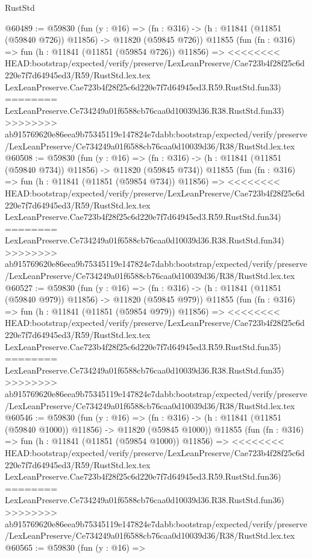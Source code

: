 \begin{lexlean}{RustStd}
\begin{coremodule}
{\begin{coremodule}
{{{{{{{{{{{{{{{{{{{{{{{{{{{{{{{{{{{{{{{{{{{{{{{{{{@60489 := @59830
    (fun (y : @16) =>
    (fn : @316) -> (h : @11841 (@11851 (@59840 @726)) @11856) -> @11820 (@59845 @726))
    @11855
    (fun (fn : @316) =>
    fun (h : @11841 (@11851 (@59854 @726)) @11856) =>
<<<<<<<< HEAD:bootstrap/expected/verify/preserve/LexLeanPreserve/Cae723b4f28f25c6d220e7f7d64945ed3/R59/RustStd.lex.tex
    LexLeanPreserve.Cae723b4f28f25c6d220e7f7d64945ed3.R59.RustStd.fun33)
========
    LexLeanPreserve.Ce734249a01f6588cb76caa0d10039d36.R38.RustStd.fun33)
>>>>>>>> ab915769620e86eea9b75345119e147824e7dabb:bootstrap/expected/verify/preserve/LexLeanPreserve/Ce734249a01f6588cb76caa0d10039d36/R38/RustStd.lex.tex
@60508 := @59830
    (fun (y : @16) =>
    (fn : @316) -> (h : @11841 (@11851 (@59840 @734)) @11856) -> @11820 (@59845 @734))
    @11855
    (fun (fn : @316) =>
    fun (h : @11841 (@11851 (@59854 @734)) @11856) =>
<<<<<<<< HEAD:bootstrap/expected/verify/preserve/LexLeanPreserve/Cae723b4f28f25c6d220e7f7d64945ed3/R59/RustStd.lex.tex
    LexLeanPreserve.Cae723b4f28f25c6d220e7f7d64945ed3.R59.RustStd.fun34)
========
    LexLeanPreserve.Ce734249a01f6588cb76caa0d10039d36.R38.RustStd.fun34)
>>>>>>>> ab915769620e86eea9b75345119e147824e7dabb:bootstrap/expected/verify/preserve/LexLeanPreserve/Ce734249a01f6588cb76caa0d10039d36/R38/RustStd.lex.tex
@60527 := @59830
    (fun (y : @16) =>
    (fn : @316) -> (h : @11841 (@11851 (@59840 @979)) @11856) -> @11820 (@59845 @979))
    @11855
    (fun (fn : @316) =>
    fun (h : @11841 (@11851 (@59854 @979)) @11856) =>
<<<<<<<< HEAD:bootstrap/expected/verify/preserve/LexLeanPreserve/Cae723b4f28f25c6d220e7f7d64945ed3/R59/RustStd.lex.tex
    LexLeanPreserve.Cae723b4f28f25c6d220e7f7d64945ed3.R59.RustStd.fun35)
========
    LexLeanPreserve.Ce734249a01f6588cb76caa0d10039d36.R38.RustStd.fun35)
>>>>>>>> ab915769620e86eea9b75345119e147824e7dabb:bootstrap/expected/verify/preserve/LexLeanPreserve/Ce734249a01f6588cb76caa0d10039d36/R38/RustStd.lex.tex
@60546 := @59830
    (fun (y : @16) =>
    (fn : @316) -> (h : @11841 (@11851 (@59840 @1000)) @11856) -> @11820 (@59845 @1000))
    @11855
    (fun (fn : @316) =>
    fun (h : @11841 (@11851 (@59854 @1000)) @11856) =>
<<<<<<<< HEAD:bootstrap/expected/verify/preserve/LexLeanPreserve/Cae723b4f28f25c6d220e7f7d64945ed3/R59/RustStd.lex.tex
    LexLeanPreserve.Cae723b4f28f25c6d220e7f7d64945ed3.R59.RustStd.fun36)
========
    LexLeanPreserve.Ce734249a01f6588cb76caa0d10039d36.R38.RustStd.fun36)
>>>>>>>> ab915769620e86eea9b75345119e147824e7dabb:bootstrap/expected/verify/preserve/LexLeanPreserve/Ce734249a01f6588cb76caa0d10039d36/R38/RustStd.lex.tex
@60565 := @59830
    (fun (y : @16) =>
}}}}}}}}}}}}}}}}}}}}}}}}}}}}}}}}}}}}}}}}}}}}}}}}}}
\end{coremodule}}
\end{coremodule}
\end{lexlean}
